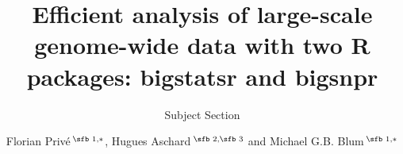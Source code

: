 \documentclass{bioinfo}
\begin{document}

\subtitle{Subject Section}

\title[R packages for analyzing genome-wide data]{Efficient analysis of large-scale genome-wide data with two R packages: bigstatsr and bigsnpr}
\author[Sample \textit{et~al}.]{Florian Priv\'e\,$^{\text{\sfb 1,}*}$, Hugues Aschard\,$^{\text{\sfb 2,\sfb 3}}$ and Michael G.B. Blum\,$^{\text{\sfb 1,}*}$}
\address{$^{\text{\sf 1}}$Universit\'e Grenoble Alpes, CNRS, Laboratoire TIMC-IMAG, UMR 5525, France, \\
$^{\text{\sf 2}}$Centre de Bioinformatique, Biostatistique et Biologie Int\'egrative (C3BI), Institut Pasteur, Paris, France, \\
$^{\text{\sf 3}}$Department of Epidemiology, Harvard T.H. Chan School of Public Health, Boston, Massachusetts, USA.}



\end{document}
